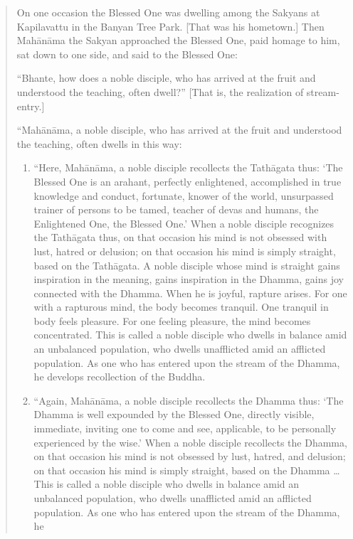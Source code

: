\begin{quotation}
On one occasion the Blessed One was dwelling among the Sakyans at
Kapilavattu in the Banyan Tree Park. {[}That was his hometown.{]} Then
Mahānāma the Sakyan approached the Blessed One, paid homage to him, sat
down to one side, and said to the Blessed One:

“Bhante, how does a noble disciple, who has arrived at the fruit and
understood the teaching, often dwell?” {[}That is, the realization of
stream-entry.{]}

“Mahānāma, a noble disciple, who has arrived at the fruit and understood
the teaching, often dwells in this way:

\begin{enumerate}
\def\labelenumi{(\arabic{enumi})}
\item
  “Here, Mahānāma, a noble disciple recollects the Tathāgata thus: ‘The
  Blessed One is an arahant, perfectly enlightened, accomplished in true
  knowledge and conduct, fortunate, knower of the world, unsurpassed
  trainer of persons to be tamed, teacher of devas and humans, the
  Enlightened One, the Blessed One.’ When a noble disciple recognizes
  the Tathāgata thus, on that occasion his mind is not obsessed with
  lust, hatred or delusion; on that occasion his mind is simply
  straight, based on the Tathāgata. A noble disciple whose mind is
  straight gains inspiration in the meaning, gains inspiration in the
  Dhamma, gains joy connected with the Dhamma. When he is joyful,
  rapture arises. For one with a rapturous mind, the body becomes
  tranquil. One tranquil in body feels pleasure. For one feeling
  pleasure, the mind becomes concentrated. This is called a noble
  disciple who dwells in balance amid an unbalanced population, who
  dwells unafflicted amid an afflicted population. As one who has
  entered upon the stream of the Dhamma, he develops recollection of the
  Buddha.
\item
  “Again, Mahānāma, a noble disciple recollects the Dhamma thus: ‘The
  Dhamma is well expounded by the Blessed One, directly visible,
  immediate, inviting one to come and see, applicable, to be personally
  experienced by the wise.’ When a noble disciple recollects the Dhamma,
  on that occasion his mind is not obsessed by lust, hatred, and
  delusion; on that occasion his mind is simply straight, based on the
  Dhamma \ldots{} This is called a noble disciple who dwells in balance amid
  an unbalanced population, who dwells unafflicted amid an afflicted
  population. As one who has entered upon the stream of the Dhamma, he

\end{enumerate}
\end{quotation}
